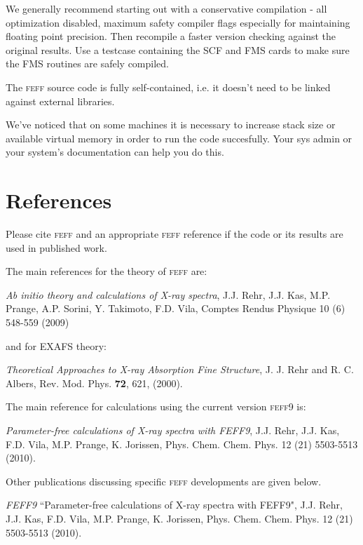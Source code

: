 \documentclass[11pt,oneside]{report} %
\newcommand{\program}[1]{\textsc{#1}}
\newcommand{\feff}{\program{feff}}
\newcommand{\vnum}{9}
\newcommand{\feffcur}{\feff\vnum}
\begin{document}
\begin{latexonly}
We generally recommend starting out with a conservative compilation - all optimization disabled,
maximum safety compiler flags especially for maintaining floating point precision.  Then recompile a
faster version checking against the original results.  Use a testcase containing the SCF and FMS cards
to make sure the FMS routines are safely compiled.

The {\feff} source code is fully self-contained, i.e. it doesn't need to be linked against external libraries.

We've noticed that on some machines it is necessary to increase stack size or available virtual memory
in order to run the code succesfully.  Your sys admin or your system's documentation can help you do this.



\chapter{References}
\label{sec:Append-C-Refer}


Please cite {\feff} and an appropriate {\feff} reference if the code or its results are used in published work. 

The main references for the theory of {\feff} are:

\emph{Ab initio theory and calculations of X-ray spectra},
 J.J. Rehr, J.J. Kas, M.P. Prange, A.P. Sorini, Y. Takimoto, F.D. Vila, Comptes Rendus Physique 10 (6) 548-559 (2009)
 
and for EXAFS theory:

\emph{Theoretical Approaches to X-ray Absorption Fine Structure},
J. J. Rehr and R. C. Albers, Rev. Mod. Phys. {\bf72}, 621, (2000).
 

The main reference for calculations using the current version {\feffcur}  is:

\emph{Parameter-free calculations of X-ray spectra with FEFF9}, J.J. Rehr, J.J. Kas, F.D. Vila, M.P. Prange, K. Jorissen, Phys. Chem. Chem. Phys. 12 (21) 5503-5513 (2010).


\medskip
\medskip
Other publications discussing specific {\feff} developments are given below.

\begin{Reflist}

\item [\textit{FEFF9}]  ``Parameter-free calculations of X-ray spectra with FEFF9", J.J. Rehr, J.J. Kas, F.D. Vila, M.P. Prange, K. Jorissen, Phys. Chem. Chem. Phys. 12 (21) 5503-5513 (2010).


\end{Reflist}
\end{latexonly}
\end{document}
